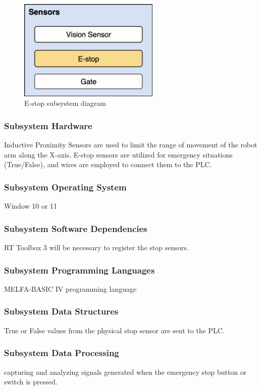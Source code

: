 \begin{figure}[h!]
	\centering
 	\includegraphics[width=0.60\textwidth]{images/E-stop}
 \caption{E-stop subsystem diagram}
\end{figure}

\subsubsection{Subsystem Hardware}
Inductive Proximity Sensors are used to limit the range of movement of the robot arm along the X-axis, E-stop sensors are utilized for emergency situations (True/False), and wires are employed to connect them to the PLC.

\subsubsection{Subsystem Operating System}
Window 10 or 11

\subsubsection{Subsystem Software Dependencies}
RT Toolbox 3 will be necessary to register the stop sensors.

\subsubsection{Subsystem Programming Languages}
MELFA-BASIC IV programming language

\subsubsection{Subsystem Data Structures}
True or False values from the physical stop sensor are sent to the PLC.

\subsubsection{Subsystem Data Processing}
capturing and analyzing signals generated when the emergency stop button or switch is pressed.


